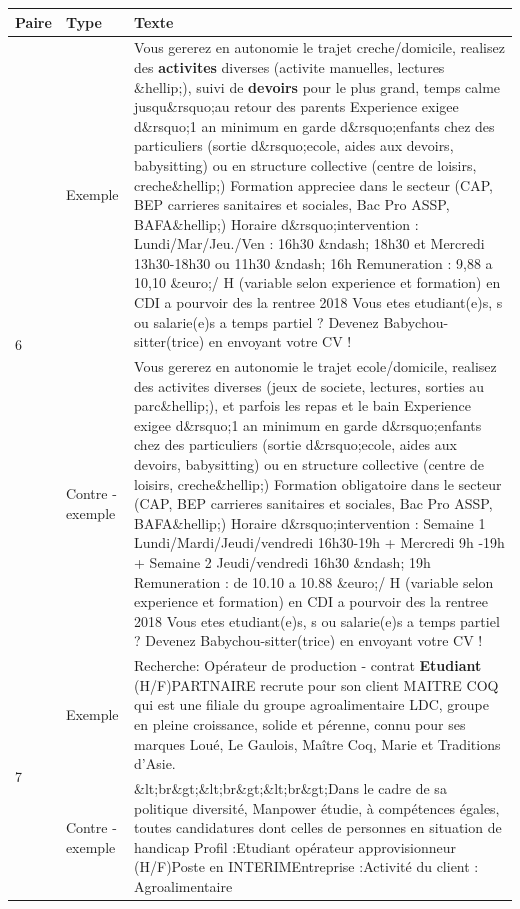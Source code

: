 \begin{table}
    \begin{tabular}{|p{}|p{}|p{}|}
        \hline
        \textbf{Paire}              & \textbf{Type}             & \textbf{Texte}                              \\ \hline
        \multirow{2}{*}{6} & Exemple          & Vous gererez en autonomie le trajet creche/domicile, realisez des \textbf{activites} diverses (activite manuelles, lectures \&hellip;), suivi de \textbf{devoirs} pour le plus grand, temps calme jusqu\&rsquo;au retour des parents   Experience exigee d\&rsquo;1 an minimum  en garde d\&rsquo;enfants chez des particuliers (sortie d\&rsquo;ecole, aides aux devoirs, babysitting) ou en structure collective (centre de loisirs, creche\&hellip;)   Formation appreciee  dans le secteur (CAP, BEP carrieres sanitaires et sociales, Bac Pro ASSP, BAFA\&hellip;)   Horaire d\&rsquo;intervention : Lundi/Mar/Jeu./Ven : 16h30 \&ndash; 18h30 et Mercredi 13h30-18h30 ou 11h30 \&ndash; 16h   Remuneration : 9,88 a 10,10 \&euro;/ H (variable selon experience et formation)   en CDI a pourvoir des la rentree 2018   Vous etes etudiant(e)s, s ou salarie(e)s a temps partiel ? Devenez Babychou-sitter(trice) en envoyant votre CV ! \\ \cline{2-3}
                           & Contre - exemple & Vous gererez en autonomie le trajet ecole/domicile, realisez des activites diverses (jeux de societe, lectures, sorties au parc\&hellip;), et parfois les repas et le bain   Experience exigee d\&rsquo;1 an minimum  en garde d\&rsquo;enfants chez des particuliers (sortie d\&rsquo;ecole, aides aux devoirs, babysitting) ou en structure collective (centre de loisirs, creche\&hellip;)   Formation obligatoire  dans le secteur (CAP, BEP carrieres sanitaires et sociales, Bac Pro ASSP, BAFA\&hellip;)   Horaire d\&rsquo;intervention : Semaine 1 Lundi/Mardi/Jeudi/vendredi 16h30-19h + Mercredi 9h -19h + Semaine 2 Jeudi/vendredi 16h30 \&ndash; 19h   Remuneration : de 10.10 a 10.88 \&euro;/ H (variable selon experience et formation)   en CDI a pourvoir des la rentree 2018   Vous etes etudiant(e)s, s ou salarie(e)s a temps partiel ? Devenez Babychou-sitter(trice) en envoyant votre CV !  \\ \hline
        \multirow{2}{*}{7} & Exemple          & Recherche: Opérateur de production - contrat \textbf{Etudiant} (H/F)PARTNAIRE recrute pour son client  MAITRE COQ qui est une filiale du groupe agroalimentaire LDC, groupe en pleine croissance, solide et pérenne, connu pour ses marques Loué, Le Gaulois, Maître Coq, Marie et Traditions d'Asie.   \\ \cline{2-3}
                           & Contre - exemple & \&lt;br\&gt;\&lt;br\&gt;\&lt;br\&gt;Dans le cadre de sa politique diversité, Manpower étudie, à compétences égales, toutes candidatures dont celles de personnes en situation de handicap Profil :Etudiant opérateur approvisionneur (H/F)Poste en INTERIMEntreprise :Activité du client : Agroalimentaire   \\ \hline
        \end{tabular}
\end{table}

